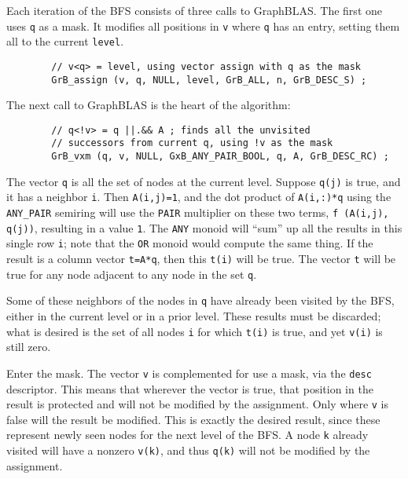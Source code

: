 \documentclass[12pt]{article}
\begin{document}
Each iteration of the BFS consists of three calls to GraphBLAS.  The first one
uses \verb'q' as a mask.  It modifies all positions in \verb'v' where \verb'q'
has an entry, setting them all to the current \verb'level'.

        {\footnotesize
        \begin{verbatim}
        // v<q> = level, using vector assign with q as the mask
        GrB_assign (v, q, NULL, level, GrB_ALL, n, GrB_DESC_S) ; \end{verbatim}}

The next call to GraphBLAS is the heart of the algorithm:

        {\footnotesize
        \begin{verbatim}
        // q<!v> = q ||.&& A ; finds all the unvisited
        // successors from current q, using !v as the mask
        GrB_vxm (q, v, NULL, GxB_ANY_PAIR_BOOL, q, A, GrB_DESC_RC) ; \end{verbatim}}

The vector \verb'q' is all the set of nodes at the current level.  Suppose
\verb'q(j)' is true, and it has a neighbor \verb'i'.  Then \verb'A(i,j)=1', and
the dot product of \verb'A(i,:)*q' using the \verb'ANY_PAIR' semiring will use
the \verb'PAIR' multiplier on these two terms, \verb'f (A(i,j), q(j))', resulting
in a value \verb'1'.  The \verb'ANY' monoid will ``sum'' up all the results
in this single row \verb'i'; note that the \verb'OR' monoid would compute the
same thing.  If the result is a column vector \verb't=A*q',
then this \verb't(i)' will be true.  The vector \verb't' will be true for
any node adjacent to any node in the set \verb'q'.

Some of these neighbors of the nodes in \verb'q' have already been visited by
the BFS, either in the current level or in a prior level.  These results must
be discarded; what is desired is the set of all nodes \verb'i' for which
\verb't(i)' is true, and yet \verb'v(i)' is still zero.

Enter the mask.  The vector \verb'v' is complemented for use a mask, via the
\verb'desc' descriptor.  This means that wherever the vector is true, that
position in the result is protected and will not be modified by the assignment.
Only where \verb'v' is false will the result be modified.  This is exactly the
desired result, since these represent newly seen nodes for the next level of
the BFS.  A node \verb'k' already visited will have a nonzero \verb'v(k)', and
thus \verb'q(k)' will not be modified by the assignment.
\end{document}
